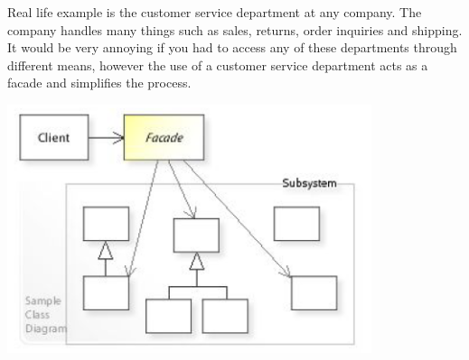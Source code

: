 Real life example is the customer service department at any company. The
company handles many things such as sales, returns, order inquiries and
shipping. It would be very annoying if you had to access any of these
departments through different means, however the use of a customer service
department acts as a facade and simplifies the process.

\begin{center}
    \includegraphics[width=0.8\textwidth]{./facade}
\end{center}

